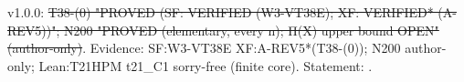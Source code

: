 \begin{theorem}\label{reg:SOP_TH05.0}
\end{theorem}
\begin{statusbox}
 v1.0.0: \st{T38-(0) "PROVED (SF: VERIFIED (W3-VT38E); XF: VERIFIED* (A-REV5))"; N200 "PROVED (elementary, every n); Π(X) upper bound OPEN" (author-only)}. Evidence: SF:W3-VT38E XF:A-REV5*(T38-(0)); N200 author-only; Lean:T21HPM t21\_C1 sorry-free (finite core). Statement: .
\end{statusbox}
